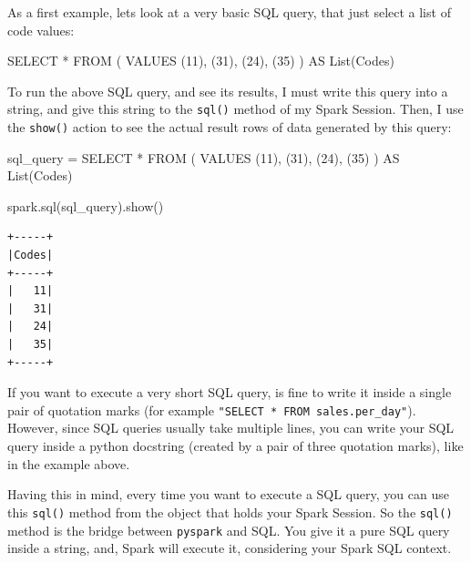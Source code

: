 \documentclass[
  11pt,
  letterpaper,
  DIV=11,
  numbers=noendperiod]{scrreprt}
\newenvironment{Shaded}{\begin{snugshade}}{\end{snugshade}}
\newcommand{\DecValTok}[1]{\textcolor[rgb]{0.68,0.00,0.00}{#1}}
\newcommand{\KeywordTok}[1]{\textcolor[rgb]{0.00,0.23,0.31}{#1}}
\newcommand{\NormalTok}[1]{\textcolor[rgb]{0.00,0.23,0.31}{#1}}
\newcommand{\OperatorTok}[1]{\textcolor[rgb]{0.37,0.37,0.37}{#1}}
\newcommand{\StringTok}[1]{\textcolor[rgb]{0.13,0.47,0.30}{#1}}
\begin{document}
As a first example, lets look at a very basic SQL query, that just
select a list of code values:

\begin{Shaded}
\begin{Highlighting}[]
\KeywordTok{SELECT} \OperatorTok{*}
\KeywordTok{FROM}\NormalTok{ (}
  \KeywordTok{VALUES}\NormalTok{ (}\DecValTok{11}\NormalTok{), (}\DecValTok{31}\NormalTok{), (}\DecValTok{24}\NormalTok{), (}\DecValTok{35}\NormalTok{)}
\NormalTok{) }\KeywordTok{AS} \KeywordTok{List}\NormalTok{(Codes)}
\end{Highlighting}
\end{Shaded}

To run the above SQL query, and see its results, I must write this query
into a string, and give this string to the \texttt{sql()} method of my
Spark Session. Then, I use the \texttt{show()} action to see the actual
result rows of data generated by this query:

\begin{Shaded}
\begin{Highlighting}[]
\NormalTok{sql\_query }\OperatorTok{=} \StringTok{\textquotesingle{}\textquotesingle{}\textquotesingle{}}
\StringTok{SELECT *}
\StringTok{FROM (}
\StringTok{  VALUES (11), (31), (24), (35)}
\StringTok{) AS List(Codes)}
\StringTok{\textquotesingle{}\textquotesingle{}\textquotesingle{}}

\NormalTok{spark.sql(sql\_query).show()}
\end{Highlighting}
\end{Shaded}

\begin{verbatim}
+-----+
|Codes|
+-----+
|   11|
|   31|
|   24|
|   35|
+-----+
\end{verbatim}

If you want to execute a very short SQL query, is fine to write it
inside a single pair of quotation marks (for example
\texttt{"SELECT\ *\ FROM\ sales.per\_day"}). However, since SQL queries
usually take multiple lines, you can write your SQL query inside a
python docstring (created by a pair of three quotation marks), like in
the example above.

Having this in mind, every time you want to execute a SQL query, you can
use this \texttt{sql()} method from the object that holds your Spark
Session. So the \texttt{sql()} method is the bridge between
\texttt{pyspark} and SQL. You give it a pure SQL query inside a string,
and, Spark will execute it, considering your Spark SQL context.
\end{document}
